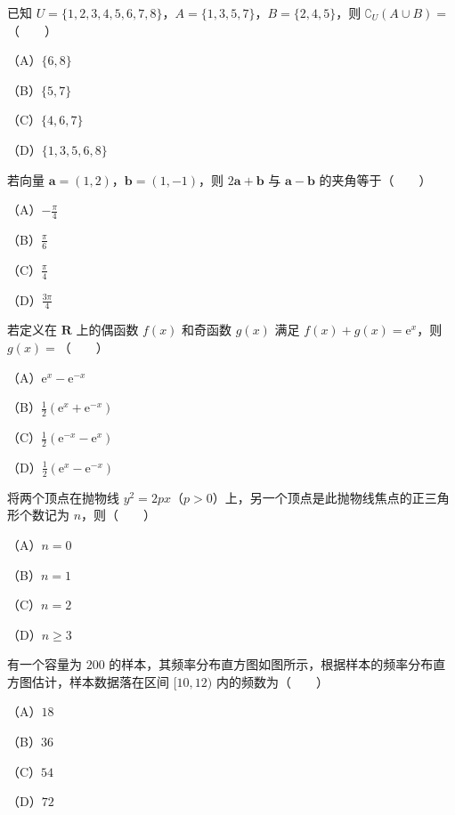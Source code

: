

\begin{question}
已知 $U=\{1,2,3,4,5,6,7,8\}$，$A=\{1,3,5,7\}$，$B=\{2,4,5\}$，则 $\complement_U(A\cup B)=$\mbox{（　　）}

（A）$\{6,8\}$

（B）$\{5,7\}$

（C）$\{4,6,7\}$

（D）$\{1,3,5,6,8\}$

\end{question}
\begin{question}
若向量 $\boldsymbol a=(1,2)$，$\boldsymbol b=(1,-1)$，则 $2\boldsymbol a+\boldsymbol b$ 与 $\boldsymbol a-\boldsymbol b$ 的夹角等于\mbox{（　　）}

（A）$-\frac\pi4$

（B）$\frac\pi6$

（C）$\frac\pi4$

（D）$\frac{3\pi}4$

\end{question}
\begin{question}
若定义在 $\mathbf R$ 上的偶函数 $f(x)$ 和奇函数 $g(x)$ 满足 $f(x)+g(x)=\mathrm e^x$，则 $g(x)=$\mbox{（　　）}

（A）$\mathrm e^x-\mathrm e^{-x}$

（B）$\frac12(\mathrm e^x+\mathrm e^{-x})$

（C）$\frac12(\mathrm e^{-x}-\mathrm e^x)$

（D）$\frac12(\mathrm e^x-\mathrm e^{-x})$

\end{question}
\begin{question}
将两个顶点在抛物线 $y^2=2px$（$p>0$）上，另一个顶点是此抛物线焦点的正三角形个数记为 $n$，则\mbox{（　　）}

（A）$n=0$

（B）$n=1$

（C）$n=2$

（D）$n\geqslant3$

\Needspace{0.4\textheight}
\end{question}
\begin{question}
有一个容量为 $200$ 的样本，其频率分布直方图如图所示，根据样本的频率分布直方图估计，样本数据落在区间 $[10,12)$ 内的频数为\mbox{（　　）}

（A）$18$

（B）$36$

（C）$54$

（D）$72$
\nopagebreak[4]
\begin{center}\end{center}
\nopagebreak[4]
\end{question}
